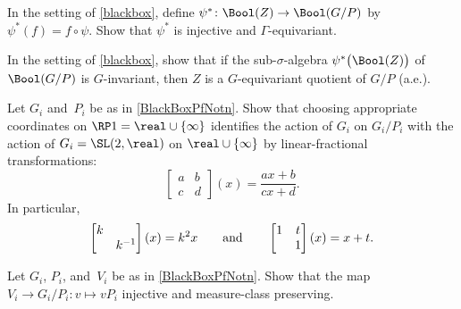 \begin{exercises}

\item \label{B(Z)InjectsEx}
In the setting of \cref{blackbox}, define $\psi^* \colon \Bool(Z) \to \Bool(G/P)$ by $\psi^*(f) = f \circ \psi$.
Show that $\psi^*$ is injective and $\Gamma$-equivariant.


\item \label{ZGInvt->GQuot}
In the setting of \cref{blackbox}, show that if the sub-$\sigma$-algebra $\psi^* \bigl( \Bool(Z) \bigr)$ of $\Bool(G/P)$ is $G$-invariant, then $Z$ is a $G$-equivariant quotient of $G/P$ (a.e.).

\item \label{GiActsByLinFracEx}
Let $G_i$ and~$P_i$ be as in \cref{BlackBoxPfNotn}.  Show that choosing appropriate coordinates on $\RP1 = \real \cup \{\infty\}$ identifies the action of $G_i$ on $G_i/P_i$ with the action of $G_i = \SL(2,\real)$ on $\real \cup \{\infty\}$ by linear-fractional transformations:
	$$ \begin{bmatrix} a & b \\ c & d \end{bmatrix} (x) = \frac{ax + b}{cx + d} .$$
In particular, 
	$$\begin{bmatrix} k & \\ & k^{-1} \end{bmatrix} (x) = k^2 x 
	\text{\qquad and\qquad}
	 \begin{bmatrix} 1 & t\\ & 1 \end{bmatrix} (x) = x + t . $$

\item \label{Gi/Pi=ViEx}
Let $G_i$, $P_i$, and~$V_i$ be as in \cref{BlackBoxPfNotn}. 
Show that the map $V_i \to G_i/P_i \colon v \mapsto v P_i$ injective and measure-class preserving.


\end{exercises}
